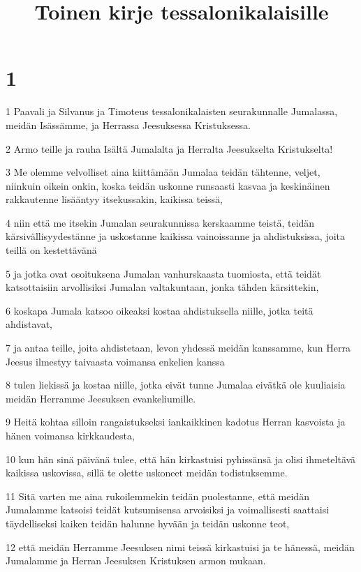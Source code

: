 

\title{Toinen kirje tessalonikalaisille}


\chapter{1}

\par 1 Paavali ja Silvanus ja Timoteus tessalonikalaisten seurakunnalle Jumalassa, meidän Isässämme, ja Herrassa Jeesuksessa Kristuksessa.
\par 2 Armo teille ja rauha Isältä Jumalalta ja Herralta Jeesukselta Kristukselta!
\par 3 Me olemme velvolliset aina kiittämään Jumalaa teidän tähtenne, veljet, niinkuin oikein onkin, koska teidän uskonne runsaasti kasvaa ja keskinäinen rakkautenne lisääntyy itsekussakin, kaikissa teissä,
\par 4 niin että me itsekin Jumalan seurakunnissa kerskaamme teistä, teidän kärsivällisyydestänne ja uskostanne kaikissa vainoissanne ja ahdistuksissa, joita teillä on kestettävänä
\par 5 ja jotka ovat osoituksena Jumalan vanhurskaasta tuomiosta, että teidät katsottaisiin arvollisiksi Jumalan valtakuntaan, jonka tähden kärsittekin,
\par 6 koskapa Jumala katsoo oikeaksi kostaa ahdistuksella niille, jotka teitä ahdistavat,
\par 7 ja antaa teille, joita ahdistetaan, levon yhdessä meidän kanssamme, kun Herra Jeesus ilmestyy taivaasta voimansa enkelien kanssa
\par 8 tulen liekissä ja kostaa niille, jotka eivät tunne Jumalaa eivätkä ole kuuliaisia meidän Herramme Jeesuksen evankeliumille.
\par 9 Heitä kohtaa silloin rangaistukseksi iankaikkinen kadotus Herran kasvoista ja hänen voimansa kirkkaudesta,
\par 10 kun hän sinä päivänä tulee, että hän kirkastuisi pyhissänsä ja olisi ihmeteltävä kaikissa uskovissa, sillä te olette uskoneet meidän todistuksemme.
\par 11 Sitä varten me aina rukoilemmekin teidän puolestanne, että meidän Jumalamme katsoisi teidät kutsumisensa arvoisiksi ja voimallisesti saattaisi täydelliseksi kaiken teidän halunne hyvään ja teidän uskonne teot,
\par 12 että meidän Herramme Jeesuksen nimi teissä kirkastuisi ja te hänessä, meidän Jumalamme ja Herran Jeesuksen Kristuksen armon mukaan.

